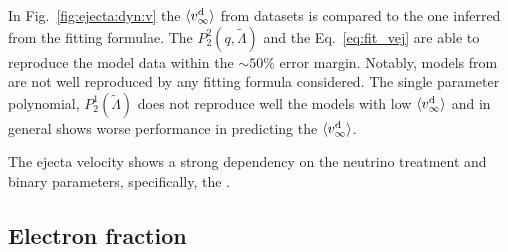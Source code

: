 In Fig.~\ref{fig:ejecta:dyn:v} the $\langle v^{\text{d}}_\infty\rangle$ from datasets is compared to the one 
inferred from the fitting formulae. The $P_2^2(q,\tilde\Lambda)$ and the 
Eq.~\eqref{eq:fit_vej} are able to reproduce the model data within the $\sim50\%$ 
error margin. Notably, models from \DSnone{} are not well reproduced by any fitting 
formula considered. The single parameter polynomial, $P_2^1(\tilde\Lambda)$ does not 
reproduce well the models with low $\langle v^{\text{d}}_\infty\rangle$ and in general shows worse performance in 
predicting the $\langle v^{\text{d}}_\infty\rangle$.

%
The ejecta velocity shows a strong dependency on the neutrino treatment and binary parameters, 
specifically, the \mr{}.


\subsection{Electron fraction} 

